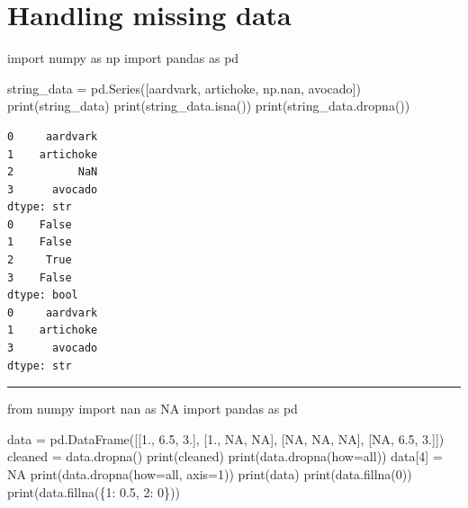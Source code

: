 \documentclass[
  english,
  letterpaper,
  DIV=11,
  numbers=noendperiod]{scrreprt}
\newenvironment{Shaded}{\begin{snugshade}}{\end{snugshade}}
\newcommand{\BuiltInTok}[1]{\textcolor[rgb]{0.00,0.23,0.31}{#1}}
\newcommand{\DecValTok}[1]{\textcolor[rgb]{0.68,0.00,0.00}{#1}}
\newcommand{\FloatTok}[1]{\textcolor[rgb]{0.68,0.00,0.00}{#1}}
\newcommand{\ImportTok}[1]{\textcolor[rgb]{0.00,0.46,0.62}{#1}}
\newcommand{\NormalTok}[1]{\textcolor[rgb]{0.00,0.23,0.31}{#1}}
\newcommand{\OperatorTok}[1]{\textcolor[rgb]{0.37,0.37,0.37}{#1}}
\newcommand{\StringTok}[1]{\textcolor[rgb]{0.13,0.47,0.30}{#1}}
\begin{document}
\section{Handling missing data}\label{handling-missing-data}

\begin{Shaded}
\begin{Highlighting}[]
\ImportTok{import}\NormalTok{ numpy }\ImportTok{as}\NormalTok{ np}
\ImportTok{import}\NormalTok{ pandas }\ImportTok{as}\NormalTok{ pd}

\NormalTok{string\_data }\OperatorTok{=}\NormalTok{ pd.Series([}\StringTok{\textquotesingle{}aardvark\textquotesingle{}}\NormalTok{, }\StringTok{\textquotesingle{}artichoke\textquotesingle{}}\NormalTok{, np.nan, }\StringTok{\textquotesingle{}avocado\textquotesingle{}}\NormalTok{])}
\BuiltInTok{print}\NormalTok{(string\_data)}
\BuiltInTok{print}\NormalTok{(string\_data.isna())}
\BuiltInTok{print}\NormalTok{(string\_data.dropna())}
\end{Highlighting}
\end{Shaded}

\begin{verbatim}
0     aardvark
1    artichoke
2          NaN
3      avocado
dtype: str
0    False
1    False
2     True
3    False
dtype: bool
0     aardvark
1    artichoke
3      avocado
dtype: str
\end{verbatim}

\begin{center}\rule{0.5\linewidth}{0.5pt}\end{center}

\begin{Shaded}
\begin{Highlighting}[]
\ImportTok{from}\NormalTok{ numpy }\ImportTok{import}\NormalTok{ nan }\ImportTok{as}\NormalTok{ NA}
\ImportTok{import}\NormalTok{ pandas }\ImportTok{as}\NormalTok{ pd}

\NormalTok{data }\OperatorTok{=}\NormalTok{ pd.DataFrame([[}\FloatTok{1.}\NormalTok{, }\FloatTok{6.5}\NormalTok{, }\FloatTok{3.}\NormalTok{], [}\FloatTok{1.}\NormalTok{, NA, NA],}
\NormalTok{                     [NA, NA, NA], [NA, }\FloatTok{6.5}\NormalTok{, }\FloatTok{3.}\NormalTok{]])}
\NormalTok{cleaned }\OperatorTok{=}\NormalTok{ data.dropna()}
\BuiltInTok{print}\NormalTok{(cleaned)}
\BuiltInTok{print}\NormalTok{(data.dropna(how}\OperatorTok{=}\StringTok{\textquotesingle{}all\textquotesingle{}}\NormalTok{))}
\NormalTok{data[}\DecValTok{4}\NormalTok{] }\OperatorTok{=}\NormalTok{ NA}
\BuiltInTok{print}\NormalTok{(data.dropna(how}\OperatorTok{=}\StringTok{\textquotesingle{}all\textquotesingle{}}\NormalTok{, axis}\OperatorTok{=}\DecValTok{1}\NormalTok{))}
\BuiltInTok{print}\NormalTok{(data)}
\BuiltInTok{print}\NormalTok{(data.fillna(}\DecValTok{0}\NormalTok{))}
\BuiltInTok{print}\NormalTok{(data.fillna(\{}\DecValTok{1}\NormalTok{: }\FloatTok{0.5}\NormalTok{, }\DecValTok{2}\NormalTok{: }\DecValTok{0}\NormalTok{\}))}
\end{Highlighting}
\end{Shaded}
\end{document}
